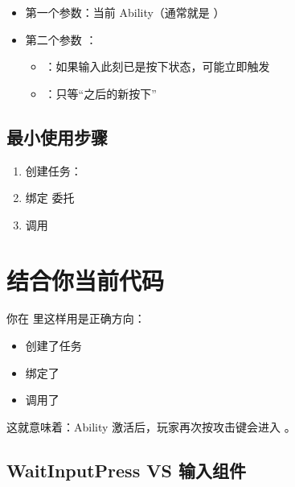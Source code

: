 \begin{itemize}
	\item 第一个参数：当前 Ability（通常就是 ）
	\item 第二个参数 ：
	\begin{itemize}
		\item {}：如果输入此刻已是按下状态，可能立即触发
		\item {}：只等“之后的新按下”
	\end{itemize}
\end{itemize}

\subsection{最小使用步骤}

\begin{enumerate}
	\item 创建任务：
	\item 绑定  委托
	\item 调用 
\end{enumerate}

\section{结合你当前代码}

你在  里这样用是正确方向：

\begin{itemize}
	\item {} 创建了任务
	\item 绑定了 
	\item 调用了 
\end{itemize}

这就意味着：Ability 激活后，玩家再次按攻击键会进入 。
\subsection{WaitInputPress VS 输入组件}

